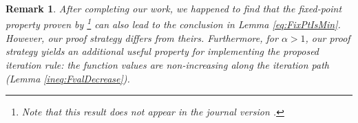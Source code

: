 \documentclass{article}
\newtheorem{lemma}[theorem]{Lemma}
\newtheorem{corollary}[theorem]{Corollary}
\newtheorem{remark}{Remark}[section]
\begin{document}
\begin{remark}
    After completing our work, we happened to find that the fixed-point property proven by \citet[Proposition 4(c)]{Cheng2018}\footnote{Note that this result does not appear in the journal version \cite{Cheng2022}.} can also lead to the conclusion in Lemma \ref{eq:FixPtIsMin}.
    However, our proof strategy differs from theirs.
    Furthermore, for $\alpha > 1$, our proof strategy yields an additional useful property for implementing the proposed iteration rule: the function values are non-increasing along the iteration path (Lemma \ref{ineq:FvalDecrease}).
\end{remark}



\end{document}
